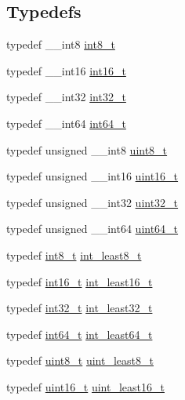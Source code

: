 \subsection*{Typedefs}
\begin{DoxyCompactItemize}
\item 
typedef \+\_\+\+\_\+int8 \hyperlink{a00119_a27eddd12ef1271a2ea8629e1148e7e63}{int8\+\_\+t}
\item 
typedef \+\_\+\+\_\+int16 \hyperlink{a00119_a044293bfeff56852a28ed6c2cfbb2649}{int16\+\_\+t}
\item 
typedef \+\_\+\+\_\+int32 \hyperlink{a00119_a37994e3b11c72957c6f454c6ec96d43d}{int32\+\_\+t}
\item 
typedef \+\_\+\+\_\+int64 \hyperlink{a00119_a67a9885ef4908cb72ce26d75b694386c}{int64\+\_\+t}
\item 
typedef unsigned \+\_\+\+\_\+int8 \hyperlink{a00119_a9a941819355e6f658991890ff66b4b0e}{uint8\+\_\+t}
\item 
typedef unsigned \+\_\+\+\_\+int16 \hyperlink{a00119_a30af71eaf40c925c9832eb289a48da35}{uint16\+\_\+t}
\item 
typedef unsigned \+\_\+\+\_\+int32 \hyperlink{a00119_a6eb1e68cc391dd753bc8ce896dbb8315}{uint32\+\_\+t}
\item 
typedef unsigned \+\_\+\+\_\+int64 \hyperlink{a00119_aec6fcb673ff035718c238c8c9d544c47}{uint64\+\_\+t}
\item 
typedef \hyperlink{a00119_a27eddd12ef1271a2ea8629e1148e7e63}{int8\+\_\+t} \hyperlink{a00119_aadfd725efbf565422ab13db91ccca53c}{int\+\_\+least8\+\_\+t}
\item 
typedef \hyperlink{a00119_a044293bfeff56852a28ed6c2cfbb2649}{int16\+\_\+t} \hyperlink{a00119_a17f379713bed2a28ac431760401253cd}{int\+\_\+least16\+\_\+t}
\item 
typedef \hyperlink{a00119_a37994e3b11c72957c6f454c6ec96d43d}{int32\+\_\+t} \hyperlink{a00119_a2676b57a778795e5d0598970f1407f38}{int\+\_\+least32\+\_\+t}
\item 
typedef \hyperlink{a00119_a67a9885ef4908cb72ce26d75b694386c}{int64\+\_\+t} \hyperlink{a00119_a2073b30b3170d509bc756bf5c7862caf}{int\+\_\+least64\+\_\+t}
\item 
typedef \hyperlink{a00119_a9a941819355e6f658991890ff66b4b0e}{uint8\+\_\+t} \hyperlink{a00119_ac76e2383debd5a3b100514044828961a}{uint\+\_\+least8\+\_\+t}
\item 
typedef \hyperlink{a00119_a30af71eaf40c925c9832eb289a48da35}{uint16\+\_\+t} \hyperlink{a00119_a4f3f6e6631cb4aaeadf1c59ff597b2fb}{uint\+\_\+least16\+\_\+t}

\end{DoxyCompactItemize}
